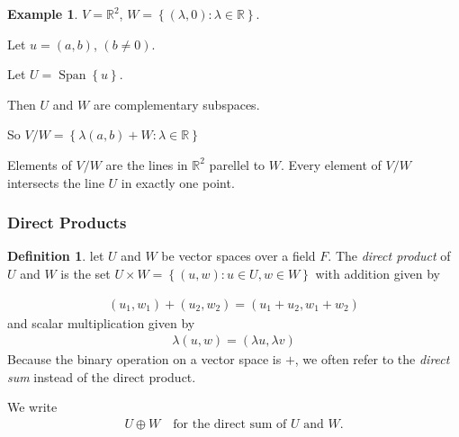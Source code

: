 \documentclass{article}
\theoremstyle{definition} \newtheorem*{definition}{Definition}
\newtheorem*{exmp}{Example} \newtheorem*{exmps}{Examples}
\newcommand{\reals}{\mathbb{R}} \newcommand{\rationals}{\mathbb{Q}}
\DeclareMathOperator{\Span}{Span}
\begin{document}
\begin{exmp}
  $V = \reals^2$, $W = \left\{ (\lambda, 0) : \lambda \in \reals \right\}$.
  
  Let $u = \left( a,b \right)$, $\left( b \neq 0 \right)$.

  Let $U = \Span\left\{ u \right\}$.

  Then $U$ and $W$ are complementary subspaces.


  So $V/W = \left\{ \lambda (a,b) + W : \lambda \in \reals \right\}$

  \begin{figure}[h]
    \centering
    \label{fig:exmpcompl}
  \end{figure}

  Elements of $V/W$ are the lines in $\reals^2$ parellel to $W$.
  Every element of $V/W$ intersects the line $U$ in exactly one point.
\end{exmp}

\subsubsection*{Direct Products}

\begin{definition}
  let $U$ and $W$ be vector spaces over a field $F$. The \emph{direct product} of $U$ and $W$ is the set $U \times W = \left\{ (u,w) : u \in U, w \in W \right\}$ with addition given by 

  \begin{align*}
    (u_1, w_1) + (u_2,w_2) = (u_1 + u_2, w_1 + w_2)
  \end{align*}
  and scalar multiplication given by
  \begin{align*}
    \lambda(u, w) = (\lambda u, \lambda v)
  \end{align*}
  Because the binary operation on a vector space is $+$, we often
  refer to the \emph{direct sum} instead of the direct product.

  We write 
  \begin{align*}
    U \oplus W \quad \text{for the direct sum of } U \text{ and } W.
  \end{align*}
\end{definition}
\end{document}
